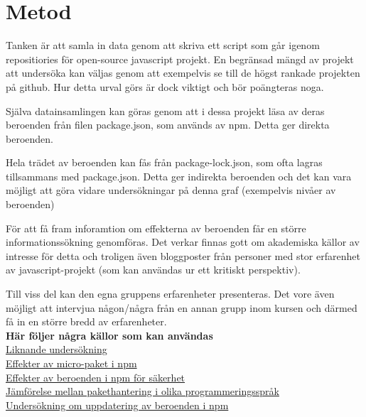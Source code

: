 \section{Metod}
\label{sec:joel_o-method}
Tanken är att samla in data genom att skriva ett script som går igenom repositiories för open-source javascript projekt. En begränsad mängd av projekt att undersöka kan väljas genom att exempelvis se till de högst rankade projekten på github. Hur detta urval görs är dock viktigt och bör poängteras noga.

Själva datainsamlingen kan göras genom att i dessa  projekt läsa av deras beroenden från filen package.json, som används av npm. Detta ger direkta beroenden.

Hela trädet av beroenden kan fås från package-lock.json, som ofta lagras tillsammans med package.json. Detta ger indirekta beroenden och det kan vara möjligt att göra vidare undersökningar på denna graf (exempelvis nivåer av beroenden)

För att få fram inforamtion om effekterna av beroenden får en större informationssökning genomföras. Det verkar finnas gott om akademiska källor av intresse för detta och troligen även bloggposter från personer med stor erfarenhet av javascript-projekt (som kan användas ur ett kritiskt perspektiv).

Till viss del kan den egna gruppens erfarenheter presenteras. Det vore även möjligt att intervjua någon/några från en annan grupp inom kursen och därmed få in en större bredd av erfarenheter.\\

\textbf{Här följer några källor som kan användas}\\
\href{https://dspace.cvut.cz/bitstream/handle/10467/68195/F8-DP-2017-Zitny-Jakub-thesis.pdf?sequence=1&isAllowed=y}{Liknande undersökning}\\
\href{https://arxiv.org/pdf/1709.04638.pdf}{Effekter av micro-paket i npm}\\
\href{https://repository.tudelft.nl/islandora/object/uuid:3a15293b-16f6-4e9d-b6a2-f02cd52f1a9e?collection=education}{Effekter av beroenden i npm för säkerhet}\\ \href{https://arxiv.org/pdf/1710.04936.pdf}{Jämförelse mellan pakethantering i olika programmeringsspråk}\\ \href{http://www.scotthenry.ca/wp-content/uploads/2018/01/Report.pdf}{Undersökning om uppdatering av beroenden i npm}\\
